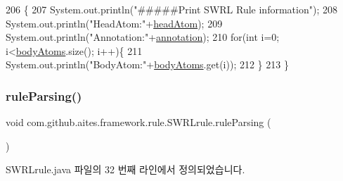 \begin{DoxyCode}
206                                    \{
207         System.out.println(\textcolor{stringliteral}{"#####Print SWRL Rule information"});
208         System.out.println(\textcolor{stringliteral}{"HeadAtom:"}+\mbox{\hyperlink{classcom_1_1github_1_1aites_1_1framework_1_1rule_1_1_s_w_r_lrule_a4ec94c9f7b37610da08df2770f6c6a71}{headAtom}});
209         System.out.println(\textcolor{stringliteral}{"Annotation:"}+\mbox{\hyperlink{classcom_1_1github_1_1aites_1_1framework_1_1rule_1_1_s_w_r_lrule_af98a0b14045d483b30ad511f0627fe3f}{annotation}});
210         \textcolor{keywordflow}{for}(\textcolor{keywordtype}{int} i=0; i<\mbox{\hyperlink{classcom_1_1github_1_1aites_1_1framework_1_1rule_1_1_s_w_r_lrule_a83f3d18acd20dd43b8ade45e8c129123}{bodyAtoms}}.size(); i++)\{
211             System.out.println(\textcolor{stringliteral}{"BodyAtom:"}+\mbox{\hyperlink{classcom_1_1github_1_1aites_1_1framework_1_1rule_1_1_s_w_r_lrule_a83f3d18acd20dd43b8ade45e8c129123}{bodyAtoms}}.get(i));
212         \}
213     \}
\end{DoxyCode}
\mbox{\label{classcom_1_1github_1_1aites_1_1framework_1_1rule_1_1_s_w_r_lrule_a1521b7ed4a4dc7b19712c12501ffec0c}} 
\subsubsection{\texorpdfstring{rule\+Parsing()}{ruleParsing()}}
{\footnotesize\ttfamily void com.\+github.\+aites.\+framework.\+rule.\+S\+W\+R\+Lrule.\+rule\+Parsing (\begin{DoxyParamCaption}{ }\end{DoxyParamCaption})\hspace{0.3cm}{\ttfamily [private]}}



S\+W\+R\+Lrule.\+java 파일의 32 번째 라인에서 정의되었습니다.


